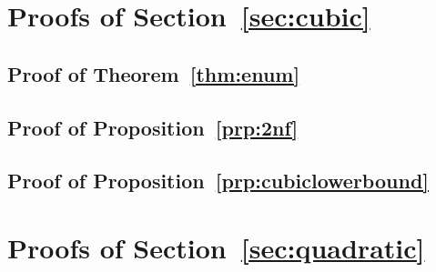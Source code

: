 
\newcommand{\proc}{\mathsf{proc}}
\newcommand{\sfi}{\mathsf{in}}
\newcommand{\sfo}{\mathsf{out}}
\newcommand{\sfl}{\mathsf{left}}
\newcommand{\sfm}{\mathsf{mid}}
\newcommand{\sfr}{\mathsf{right}}


\newcommand{\card}[1]{\left|#1\right|}

\newcommand{\M}{\mathrm{M}}
\newcommand{\Set}{\mathrm{S}}

\newcommand{\singleton}{\textsf{singleton}}

\newcommand{\I}{\mathrm{I}}
\newcommand{\D}{\mathrm{D}}


\usepackage[textwidth=2cm,textsize=small]{todonotes}

\newcommand{\cristian}[1]{\todo[inline, color=orange!30]{{\bf Cristian:} #1}}
\newcommand{\martin}[1]{\todo[inline, color=green!30]{{\bf Martin:} #1}}
\newcommand{\antoine}[1]{\todo[inline, color=pink!30]{{\bf Antoine:} #1}}
\newcommand{\louis}[1]{\todo[inline, color=blue!15]{{\bf Louis:} #1}}

\section{Proofs of Section~\ref{sec:cubic}}

\subsection{Proof of Theorem~\ref{thm:enum}}
\label{apx:enum}


\subsection{Proof of Proposition~\ref{prp:2nf}}
\label{apx:arity2}


\subsection{Proof of Proposition~\ref{prp:cubiclowerbound}}
\label{apx:cubiclowerbound}


\section{Proofs of Section~\ref{sec:quadratic}}

